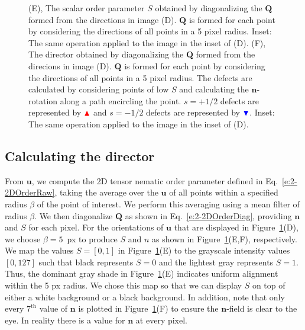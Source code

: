 \begin{figure}[H]
{(E), The scalar order parameter $S$ obtained by diagonalizing the $\mathbf{Q}$ formed from the directions in image (D).
$\mathbf{Q}$ is formed for each point by considering the directions of all points in a 5 pixel radius.
Inset: The same operation applied to the image in the inset of (D).
(F), The director obtained by diagonalizing the $\mathbf{Q}$ formed from the direcions in image (D).
$\mathbf{Q}$ is formed for each point by considering the directions of all points in a 5 pixel radius.
The defects are calculated by considering points of low $S$ and calculating the $\mathbf{n}$-rotation along a path encircling the point.
$s = +1/2$ defects are represented by ${\color{red} \blacktriangle  } $  and $s = -1/2$ defects are represented by ${ \color{blue} \blacktriangledown  } $.
Inset: The same operation applied to the image in the inset of (D).}\label{f:3-CEDF2}
\end{figure}
\newpage
\subsection{Calculating the director}
From $\mathbf{u}$, we compute the 2D tensor nematic order parameter defined in Eq.~\ref{e:2-2DOrderRaw}, taking the average over the $\mathbf{u}$ of all points within a specified radius $\beta$ of the point of interest.
We perform this averaging using a mean filter of radius $\beta$.
We then diagonalize $\mathbf{Q}$ as shown in Eq.~\ref{e:2-2DOrderDiag}, providing $\mathbf{n}$ and $S$ for each pixel.
For the orientations of $\mathbf{u}$ that are displayed in Figure~\ref{f:3-CEDF2}(D), we choose $\beta = 5$~px to produce $S$ and $n$ as shown in Figure~\ref{f:3-CEDF2}(E,F), respectively.
We map the values $S = [0, 1]$ in Figure~\ref{f:3-CEDF2}(E) to the grayscale intensity values $[0,127]$ such that black represents $S = 0$ and the lightest gray represents $S = 1$.
Thus, the dominant gray shade in Figure~\ref{f:3-CEDF2}(E) indicates uniform alignment within the 5 px radius.
We chose this map so that we can display $S$ on top of either a white background or a black background.
In addition, note that only every $7^{\textrm{th}}$ value of $\mathbf{n}$ is plotted in Figure~\ref{f:3-CEDF2}(F) to ensure the $\mathbf{n}$-field is clear to the eye.
In reality there is a value for $\mathbf{n}$ at every pixel.

